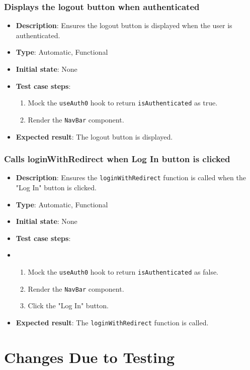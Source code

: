 \documentclass[12pt, titlepage]{article}
\begin{document}
\subsubsection{Displays the logout button when authenticated}
\begin{itemize}
    \item \textbf{Description}: Ensures the logout button is displayed when the user is authenticated.
    \item \textbf{Type}: Automatic, Functional
    \item \textbf{Initial state}: None
    \item \textbf{Test case steps}:
    \begin{enumerate}
        \item Mock the \texttt{useAuth0} hook to return \texttt{isAuthenticated} as true.
        \item Render the \texttt{NavBar} component.
    \end{enumerate}
    \item \textbf{Expected result}: The logout button is displayed.
\end{itemize}

\subsubsection{Calls loginWithRedirect when Log In button is clicked}
\begin{itemize}
    \item \textbf{Description}: Ensures the \texttt{loginWithRedirect} function is called when the "Log In" button is clicked.
    \item \textbf{Type}: Automatic, Functional
    \item \textbf{Initial state}: None
    \item \textbf{Test case steps}:
    \item \begin{enumerate}
        \item Mock the \texttt{useAuth0} hook to return \texttt{isAuthenticated} as false.
        \item Render the \texttt{NavBar} component.
        \item Click the "Log In" button.
    \end{enumerate}
    \item \textbf{Expected result}: The \texttt{loginWithRedirect} function is called.
\end{itemize}

\section{Changes Due to Testing}
\end{document}
